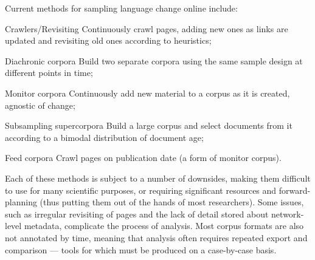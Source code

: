Current methods for sampling language change online include:

\begin{itemizeTitle}

    \item[Crawlers/Revisiting] Continuously crawl pages, adding new ones as links are updated and revisiting old ones according to heuristics;
    \item[Diachronic corpora] Build two separate corpora using the same sample design at different points in time;
    \item[Monitor corpora] Continuously add new material to a corpus as it is created, agnostic of change;
    \item[Subsampling supercorpora] Build a large corpus and select documents from it according to a bimodal distribution of document age;
    \item[Feed corpora] Crawl pages on publication date (a form of monitor corpus).

\end{itemizeTitle}


Each of these methods is subject to a number of downsides, making them difficult to use for many scientific purposes, or requiring significant resources and forward-planning (thus putting them out of the hands of most researchers).  Some issues, such as irregular revisiting of pages and the lack of detail stored about network-level metadata, complicate the process of analysis.  Most corpus formats are also not annotated by time, meaning that analysis often requires repeated export and comparison --- tools for which must be produced on a case-by-case basis.

% 
% 


